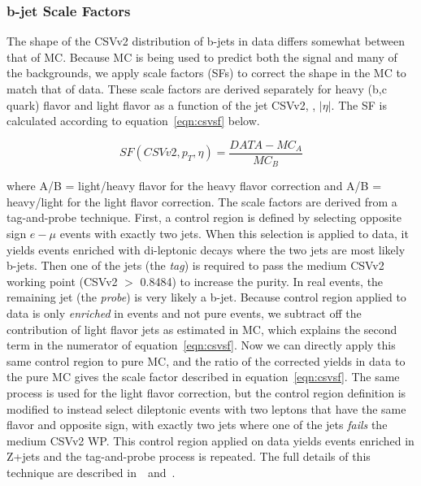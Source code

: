 \subsubsection{b-jet Scale Factors}
The shape of the CSVv2 distribution of b-jets in data differs somewhat between that of MC. Because MC is being used to predict both the signal and many of the backgrounds, we apply scale factors (SFs)
to correct the shape in the MC to match that of data. These scale factors are derived separately for heavy (b,c quark) flavor and light flavor as a function of the jet CSVv2, \pt, $|\eta|$. The SF is 
calculated according to equation~\ref{eqn:csvsf} below. 

\begin{equation}
\label{eqn:csvsf}
  SF(CSVv2,p_{T},\eta) = \frac{DATA-MC_{A}}{MC_{B}}
\end{equation}

\noindent where A/B = light/heavy flavor for the heavy flavor correction and A/B = heavy/light for the light flavor correction. The scale factors are derived from a tag-and-probe technique. First,
a control region is defined by selecting opposite sign $e-\mu$ events with exactly two jets. When this selection is applied to data, it yields events enriched with di-leptonic \ttbar decays where the
two jets are most likely b-jets. Then one of the jets (the \emph{tag}) is required to pass the medium CSVv2 working point (CSVv2 $>$ 0.8484) to increase the \ttbar purity. In real \ttbar events, the
remaining jet (the \emph{probe}) is very likely a b-jet. Because control region applied to data is only \emph{enriched} in \ttbar events and not pure \ttbar events, we subtract off the contribution of
light flavor jets as estimated in MC, which explains the second term in the numerator of equation~\ref{eqn:csvsf}. Now we can directly apply this same control region to pure \ttbar MC, and the ratio
of the corrected yields in data to the pure \ttbar MC gives the scale factor described in equation~\ref{eqn:csvsf}. The same process is used for the light flavor correction, but the control region
definition is modified to instead select dileptonic events with two leptons that have the same flavor and opposite sign, with exactly two jets where one of the jets \emph{fails} the medium CSVv2 WP.
This control region applied on data yields events enriched in Z+jets and the tag-and-probe process is repeated. The full details of this technique are described in~\cite{CMS-AN-2013-130}~and~\cite{csvsf_twiki}.

